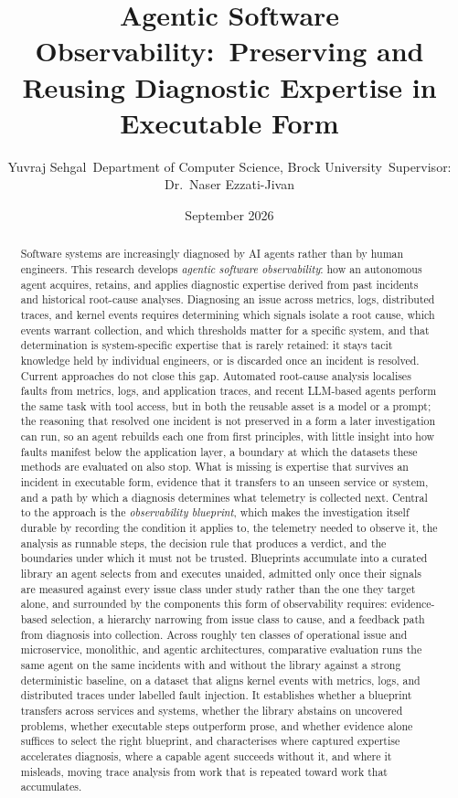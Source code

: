 \documentclass[11pt]{article}
\title{Agentic Software Observability:\
       Preserving and Reusing Diagnostic Expertise in Executable Form}
\author{Yuvraj Sehgal\
        \small Department of Computer Science, Brock University\
        \small Supervisor: Dr.\ Naser Ezzati-Jivan}
\date{September 2026}
\begin{document}
\maketitle

\begin{abstract}
Software systems are increasingly diagnosed by AI agents rather than by human engineers. This research develops \emph{agentic software observability}: how an autonomous agent acquires, retains, and applies diagnostic expertise derived from past incidents and historical root-cause analyses. Diagnosing an issue across metrics, logs, distributed traces, and kernel events requires determining which signals isolate a root cause, which events warrant collection, and which thresholds matter for a specific system, and that determination is system-specific expertise that is rarely retained: it stays tacit knowledge held by individual engineers, or is discarded once an incident is resolved. Current approaches do not close this gap. Automated root-cause analysis localises faults from metrics, logs, and application traces, and recent LLM-based agents perform the same task with tool access, but in both the reusable asset is a model or a prompt; the reasoning that resolved one incident is not preserved in a form a later investigation can run, so an agent rebuilds each one from first principles, with little insight into how faults manifest below the application layer, a boundary at which the datasets these methods are evaluated on also stop. What is missing is expertise that survives an incident in executable form, evidence that it transfers to an unseen service or system, and a path by which a diagnosis determines what telemetry is collected next. Central to the approach is the \emph{observability blueprint}, which makes the investigation itself durable by recording the condition it applies to, the telemetry needed to observe it, the analysis as runnable steps, the decision rule that produces a verdict, and the boundaries under which it must not be trusted. Blueprints accumulate into a curated library an agent selects from and executes unaided, admitted only once their signals are measured against every issue class under study rather than the one they target alone, and surrounded by the components this form of observability requires: evidence-based selection, a hierarchy narrowing from issue class to cause, and a feedback path from diagnosis into collection. Across roughly ten classes of operational issue and microservice, monolithic, and agentic architectures, comparative evaluation runs the same agent on the same incidents with and without the library against a strong deterministic baseline, on a dataset that aligns kernel events with metrics, logs, and distributed traces under labelled fault injection. It establishes whether a blueprint transfers across services and systems, whether the library abstains on uncovered problems, whether executable steps outperform prose, and whether evidence alone suffices to select the right blueprint, and characterises where captured expertise accelerates diagnosis, where a capable agent succeeds without it, and where it misleads, moving trace analysis from work that is repeated toward work that accumulates.
\end{abstract}
\end{document}
